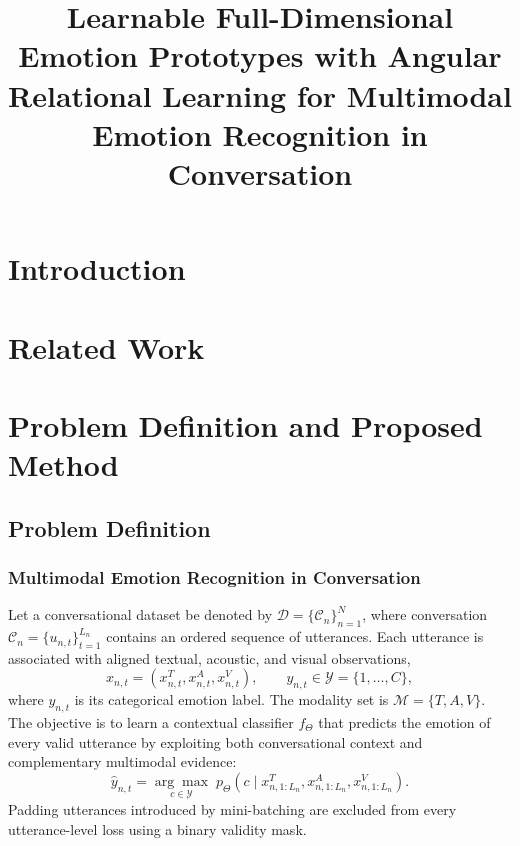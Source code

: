 \documentclass[letterpaper,journal]{IEEEtran}
\begin{document}
\title{Learnable Full-Dimensional Emotion Prototypes with Angular Relational Learning for Multimodal Emotion Recognition in Conversation}
\author{}
\maketitle

\begin{abstract}
\end{abstract}

\section{Introduction}
\label{sec:introduction}

\section{Related Work}
\label{sec:related_work}

\section{Problem Definition and Proposed Method}
\label{sec:problem_and_method}

\subsection{Problem Definition}
\label{subsec:problem_definition}

\subsubsection{Multimodal Emotion Recognition in Conversation}

Let a conversational dataset be denoted by
\(\mathcal{D}=\{\mathcal{C}_{n}\}_{n=1}^{N}\), where conversation
\(\mathcal{C}_{n}=\{u_{n,t}\}_{t=1}^{L_n}\) contains an ordered sequence of
utterances. Each utterance is associated with aligned textual, acoustic, and
visual observations,
\begin{equation}
    x_{n,t}=\left(x_{n,t}^{T},x_{n,t}^{A},x_{n,t}^{V}\right),
    \qquad
    y_{n,t}\in\mathcal{Y}=\{1,\ldots,C\},
    \label{eq:rgrpl_problem_input}
\end{equation}
where \(y_{n,t}\) is its categorical emotion label. The modality set is
\(\mathcal{M}=\{T,A,V\}\). The objective is to learn a contextual classifier
\(f_{\Theta}\) that predicts the emotion of every valid utterance by exploiting
both conversational context and complementary multimodal evidence:
\begin{equation}
    \hat y_{n,t}
    =\underset{c\in\mathcal{Y}}{\arg\max}\;
    p_{\Theta}\!\left(
    c\mid x_{n,1:L_n}^{T},x_{n,1:L_n}^{A},x_{n,1:L_n}^{V}\right).
    \label{eq:rgrpl_problem_prediction}
\end{equation}
Padding utterances introduced by mini-batching are excluded from every
utterance-level loss using a binary validity mask.
\end{document}
